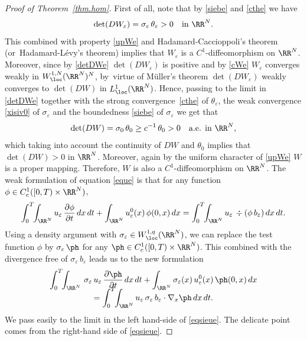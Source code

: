 \begin{proof}[Proof of Theorem~\ref{thm.hom}]
First of all, note that by \eqref{siebe} and \eqref{cthe} we have
\begin{equation}\label{detDWe}
\det (DW_\varepsilon)=\sigma_\varepsilon\,\theta_\varepsilon>0\quad\mbox{in }\RR^N.
\end{equation}
This combined with property \eqref{upWe} and Hadamard-Caccioppoli's theorem \cite{Cac} (or~Hada\-mard-Lévy's theorem) implies that $W_\varepsilon$ is a $C^1$-diffeomorphism on $\RR^N$. Moreover, since by \eqref{detDWe} $\det(DW_\varepsilon)$ is positive and by \eqref{cWe} $W_\varepsilon$ converges weakly in $W^{1,N}_\loc(\RR^N)^N$, by~virtue of Müller's theorem \cite{Mul} $\det(DW_\varepsilon)$ weakly converges to $\det(DW)$ in $L^1_\loc(\RR^N)$. Hence, passing to the limit in \eqref{detDWe} together with the strong convergence~\eqref{cthe} of $\theta_\varepsilon$, the weak convergence \eqref{xisiv0} of $\sigma_\varepsilon$ and the boundedness \eqref{siebe} of $\sigma_\varepsilon$ we get that
\begin{equation}\label{detDW}
\det (DW)=\sigma_0\,\theta_0\geq c^{-1}\,\theta_0>0\quad\mbox{a.e. in }\RR^N,
\end{equation}
which taking into account the continuity of $DW$ and $\theta_0$ implies that $\det (DW)>0$ in $\RR^N$.
Moreover, again by the uniform character of \eqref{upWe} $W$ is a proper mapping.
Therefore, $W$ is also a $C^1$-diffeomorphism on $\RR^N$.
The weak formulation of equation \eqref{eque} is that for any function $\phi\in C^1_c([0,T)\times\RR^N)$,
\begin{equation}\label{weque}
\int_0^T\!\!\int_{\RR^N}u_\varepsilon\,\dfrac{\partial\phi}{\partial t}\,dx\,dt+\int_{\RR^N}u_\varepsilon^0(x)\,\phi(0,x)\,dx=\int_0^T\!\!\int_{\RR^N}u_\varepsilon\,\div\left(\phi\,b_\varepsilon\right)dx\,dt.
\end{equation}
Using a density argument with $\sigma_\varepsilon\in W^{1,q}_\loc(\RR^N)$, we can replace the test function $\phi$ by $\sigma_\varepsilon\,\ph$ for any $\ph\in C^1_c([0,T)\times\RR^N)$. This combined with the divergence free of $\sigma_\varepsilon\,b_\varepsilon$ leads us to the new formulation
\begin{multline}\label{eqsieue}
\int_0^T\!\!\int_{\RR^N}\,\sigma_\varepsilon\,u_\varepsilon\,\dfrac{\partial\ph}{\partial t}\,dx\,dt+\int_{\RR^N}\sigma_\varepsilon(x)\,u_\varepsilon^0(x)\,\ph(0,x)\,dx\\[-8pt]
=\int_0^T\!\!\int_{\RR^N}u_\varepsilon\,\sigma_\varepsilon\,b_\varepsilon\cdot\nabla_x\ph\,dx\,dt.
\end{multline}
We pass easily to the limit in the left hand-side of \eqref{eqsieue}. The delicate point comes from the right-hand side of \eqref{eqsieue}.


\end{proof}

